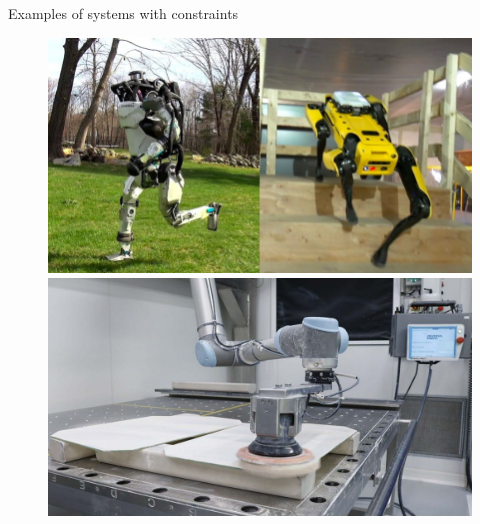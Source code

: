 \documentclass{beamer}
\begin{document}
\begin{frame}{Examples of systems with constraints}
\begin{flushleft}

\begin{figure}
\centering
\begin{minipage}{.5\textwidth}
  \centering
  \includegraphics[width=.9\linewidth]{images/pic1.jpg}
\end{minipage}%
\begin{minipage}{.5\textwidth}
  \centering
  \includegraphics[width=.9\linewidth]{images/pic2.jpg}
\end{minipage}
\end{figure}

\end{flushleft}
\end{frame}
\end{document}
